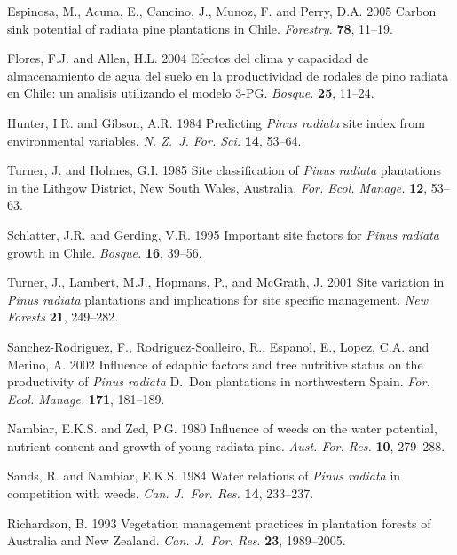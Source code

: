 \documentclass[final]{foresj}
\begin{document}
\begin{thebibliography}
Espinosa, M., Acuna, E., Cancino, J., Munoz, F. and Perry,
D.A. 2005 Carbon sink potential of radiata pine plantations
in Chile. \textit{Forestry.} \textbf{78}, 11--19.

Flores, F.J. and Allen, H.L. 2004 Efectos del clima y
capacidad de almacenamiento de agua del suelo en la
productividad de rodales de pino radiata en Chile: un
analisis utilizando el modelo 3-PG. \textit{Bosque.}
\textbf{25}, 11--24.

Hunter, I.R. and Gibson, A.R. 1984 Predicting \textit{Pinus
radiata} site index from environmental variables.
\textit{N. Z.~J. For. Sci.} \textbf{14}, 53--64.

Turner, J. and Holmes, G.I. 1985 Site classification of
\textit{Pinus radiata} plantations in the Lithgow District,
New South Wales, Australia. \textit{For. Ecol. Manage.}
\textbf{12}, 53--63.

Schlatter, J.R. and Gerding, V.R. 1995 Important site
factors for \textit{Pinus radiata} growth in Chile.
\textit{Bosque. }\textbf{16}, 39--56.

Turner, J., Lambert, M.J., Hopmans, P., and McGrath, J.
2001 Site variation in \textit{Pinus radiata} plantations
and implications for site specific management. \textit{New
Forests} \textbf{21}, 249--282.

Sanchez-Rodriguez, F., Rodriguez-Soalleiro, R., Espanol,
E., Lopez, C.A. and Merino, A. 2002 Influence of edaphic
factors and tree nutritive status on the productivity of
\textit{Pinus radiata} D.~Don plantations in northwestern
Spain. \textit{For. Ecol. Manage. }\textbf{171}, 181--189.

Nambiar, E.K.S. and Zed, P.G. 1980 Influence of weeds on
the water potential, nutrient content and growth of young
radiata pine. \textit{Aust. For. Res.} \textbf{10},
279--288.

Sands, R. and Nambiar, E.K.S. 1984 Water relations of
\textit{Pinus radiata} in competition with weeds.
\textit{Can. J.~For. Res.} \textbf{14}, 233--237.

Richardson, B. 1993 Vegetation management practices in
plantation forests of Australia and New Zealand.
\textit{Can. J.~For. Res}. \textbf{23}, 1989--2005.


\end{thebibliography}
\end{document}
